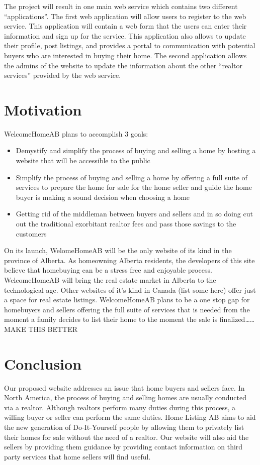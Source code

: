 \documentclass[letterpaper,12pt]{article}
\begin{document}
The project will result in one main web service which contains two different “applications”. The first web application will allow users to register to the web service. This application will contain a web form that the users can enter their information and sign up for the service. This application also allows to update their profile, post listings, and provides a portal to communication with potential buyers who are interested in buying their home. The second application allows the admins of the website to update the information about the other “realtor services” provided by the web service.


\section{Motivation}

WelcomeHomeAB plans to accomplish 3 goals: 
\begin{itemize}
	\item Demystify and simplify the process of buying and selling a home by hosting a website that will be accessible to the public
	\item Simplify the process of buying and selling a home by offering a full suite of services to prepare the home for sale for the home seller and guide the home buyer is making a sound decision when choosing a home
	\item Getting rid of the middleman between buyers and sellers and in so doing cut out the traditional exorbitant realtor fees and pass those savings to the customers
\end{itemize}

On its launch, WelomeHomeAB will be the only website of its kind in the province of Alberta. As homeowning Alberta residents, the developers of this site believe that homebuying can be a stress free and enjoyable process. WelcomeHomeAB will bring the real estate market in Alberta to the technological age.
Other websites of it’s kind in Canada (list some here) offer just a space for real estate listings. WelcomeHomeAB plans to be a one stop gap for homebuyers and sellers offering the full suite of services that is needed from the moment a family decides to list their home to the moment the sale is finalized……MAKE THIS BETTER


\section{Conclusion}
Our proposed website addresses an issue that home buyers and sellers face. In North America, the process of buying and selling homes are usually conducted via a realtor. Although realtors perform many duties during this process, a willing buyer or seller can perform the same duties. Home Listing AB aims to aid the new generation of Do-It-Yourself people by allowing them to privately list their homes for sale without the need of a realtor. Our website will also aid the sellers by providing them guidance by providing contact information on third party services that home sellers will find useful.
\end{document}
